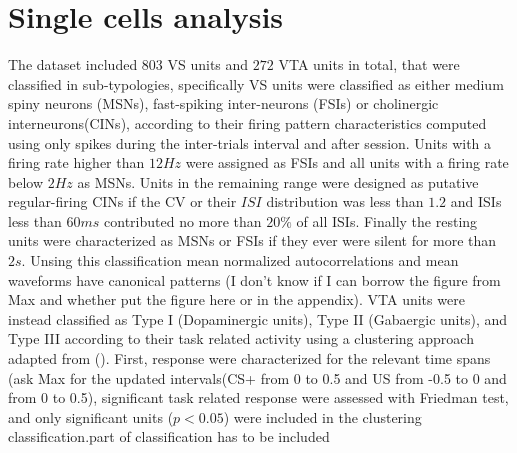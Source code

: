 \chapter{Single cells analysis}
The dataset included $803$ VS units and $272$ VTA units in total, that were classified in sub-typologies, specifically VS units were classified as either medium spiny neurons (MSNs), fast-spiking inter-neurons (FSIs) or cholinergic interneurons(CINs), according to their firing pattern characteristics computed using only spikes during the inter-trials interval and after session. Units with a firing rate higher than $12 Hz$ were assigned as FSIs and all units with a firing rate below $2 Hz$ as MSNs. Units in the remaining range were designed as putative regular-firing CINs if the CV or their $ISI$ distribution was less than $1.2$ and ISIs less than $60 ms$ contributed no more than $20\%$ of all ISIs. Finally the resting units were characterized as MSNs or FSIs if they ever were silent for more than $2 s$. Unsing this classification mean normalized autocorrelations and mean waveforms have canonical patterns ({\color{red}I don't know if I can borrow the figure from Max and whether put the figure here or in the appendix}). %
VTA units were instead classified as Type I (Dopaminergic units), Type II (Gabaergic units), and Type III according to their task related activity using a clustering approach adapted from (\cite{Uchida}). First, response were characterized for the relevant time spans ({\color{red}ask Max for the updated intervals}(CS+ from 0 to 0.5 and US from -0.5 to 0 and from 0 to 0.5), significant task related response were assessed with Friedman test, and only significant units ($p<0.05$) were included in the clustering classification.{\color{red}part of classification has to be included}
